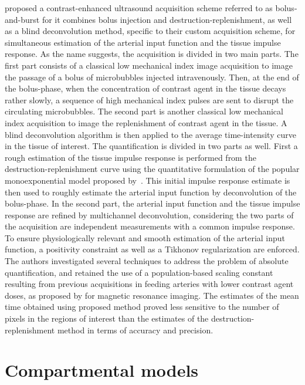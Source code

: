 \citet{Jirik:2013cla} proposed a contrast-enhanced ultrasound acquisition scheme referred to as bolus-and-burst for it combines bolus injection and destruction-replenishment, as well as a blind deconvolution method, specific to their custom acquisition scheme, for simultaneous estimation of the arterial input function and the tissue impulse response.
As the name suggests, the acquisition is divided in two main parts.
The first part consists of a classical low mechanical index image acquisition to image the passage of a bolus of microbubbles injected intravenously.
Then, at the end of the bolus-phase, when the concentration of contrast agent in the tissue decays rather slowly, a sequence of high mechanical index pulses are sent to disrupt the circulating microbubbles.
The second part is another classical low mechanical index acquisition to image the replenishment of contrast agent in the tissue.
A blind deconvolution algorithm is then applied to the average time-intensity curve in the tissue of interest.
The quantification is divided in two parts as well. 
First a rough estimation of the tissue impulse response is performed from the destruction-replenishment curve using the quantitative formulation of the popular monoexponential model proposed by~\cite{Vogel:2005ks}.
This initial impulse response estimate is then used to roughly estimate the arterial input function by deconvolution of the bolus-phase.
In the second part, the arterial input function and the tissue impulse response are refined by multichannel deconvolution, considering the two parts of the acquisition are independent measurements with a common impulse response.
To ensure physiologically relevant and smooth estimation of the arterial input function, a positivity constraint as well as a Tikhonov regularization are enforced.
The authors investigated several techniques to address the problem of absolute quantification, and retained the use of a population-based scaling constant resulting from previous acquisitions in feeding arteries with lower contrast agent doses, as proposed by \citet{Taxt:2012km} for magnetic resonance imaging.
The estimates of the mean time obtained using proposed method proved less sensitive to the number of pixels in the regions of interest than the estimates of the destruction-replenishment method in terms of accuracy and precision.


\section{Compartmental models}
\label{sec:CompartmentalModels}

